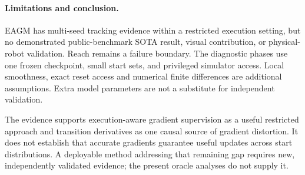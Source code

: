 \paragraph{Limitations and conclusion.}
EAGM has multi-seed tracking evidence within a restricted execution setting, but no demonstrated public-benchmark SOTA result, visual contribution, or physical-robot validation. Reach remains a failure boundary. The diagnostic phases use one frozen checkpoint, small start sets, and privileged simulator access. Local smoothness, exact reset access and numerical finite differences are additional assumptions. Extra model parameters are not a substitute for independent validation.

The evidence supports execution-aware gradient supervision as a useful restricted approach and transition derivatives as one causal source of gradient distortion. It does not establish that accurate gradients guarantee useful updates across start distributions. A deployable method addressing that remaining gap requires new, independently validated evidence; the present oracle analyses do not supply it.
